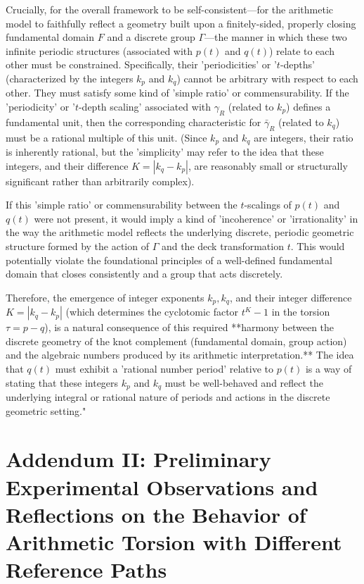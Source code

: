 \documentclass{article}[a4paper,12pt]
\begin{document}
Crucially, for the overall framework to be self-consistent—for the arithmetic model to faithfully reflect a geometry built upon a finitely-sided, properly closing fundamental domain $F$ and a discrete group $\Gamma$—the manner in which these two infinite periodic structures (associated with $p(t)$ and $q(t)$) relate to each other must be constrained. Specifically, their 'periodicities' or '$t$-depths' (characterized by the integers $k_p$ and $k_q$) cannot be arbitrary with respect to each other. They must satisfy some kind of 'simple ratio' or commensurability. If the 'periodicity' or '$t$-depth scaling' associated with $\gamma_R$ (related to $k_p$) defines a fundamental unit, then the corresponding characteristic for $\bar{\gamma}_R$ (related to $k_q$) must be a rational multiple of this unit. (Since $k_p$ and $k_q$ are integers, their ratio is inherently rational, but the 'simplicity' may refer to the idea that these integers, and their difference $K = |k_q-k_p|$, are reasonably small or structurally significant rather than arbitrarily complex).

If this 'simple ratio' or commensurability between the $t$-scalings of $p(t)$ and $q(t)$ were not present, it would imply a kind of 'incoherence' or 'irrationality' in the way the arithmetic model reflects the underlying discrete, periodic geometric structure formed by the action of $\Gamma$ and the deck transformation $t$. This would potentially violate the foundational principles of a well-defined fundamental domain that closes consistently and a group that acts discretely.

Therefore, the emergence of integer exponents $k_p, k_q$, and their integer difference $K = |k_q-k_p|$ (which determines the cyclotomic factor $t^K-1$ in the torsion $\tau = p-q$), is a natural consequence of this required **harmony between the discrete geometry of the knot complement (fundamental domain, group action) and the algebraic numbers produced by its arithmetic interpretation.** The idea that $q(t)$ must exhibit a 'rational number period' relative to $p(t)$ is a way of stating that these integers $k_p$ and $k_q$ must be well-behaved and reflect the underlying integral or rational nature of periods and actions in the discrete geometric setting."

\newpage

\section{Addendum II: Preliminary Experimental Observations and Reflections on the Behavior of Arithmetic Torsion with Different Reference Paths}
\end{document}

